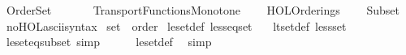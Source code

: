%
\begin{isabellebody}%
%
%
\isadelimdocument
%
\endisadelimdocument
%
\isatagdocument
%
\isamarkuptrue%
%
\endisatagdocument
{\isafolddocument}%
%
\isadelimdocument
%
\endisadelimdocument
%
\isadelimtheory
%
\endisadelimtheory
%
\isatagtheory
{}\isamarkupfalse%
\ Order{\isacharunderscore}{\kern0pt}Set\isanewline
\ \ \isanewline
\ \ \ \ Transport{\isachardot}{\kern0pt}Functions{\isacharunderscore}{\kern0pt}Monotone\isanewline
\ \ \ \ HOL{\isachardot}{\kern0pt}Orderings\isanewline
\ \ \ \ Subset\isanewline
{}%
\endisatagtheory
{\isafoldtheory}%
%
\isadelimtheory
\isanewline
%
\endisadelimtheory
\isanewline
{}\isamarkupfalse%
\ no{\isacharunderscore}{\kern0pt}HOL{\isacharunderscore}{\kern0pt}ascii{\isacharunderscore}{\kern0pt}syntax\isanewline
\isanewline
{}\isamarkupfalse%
\ set\ {\isacharcolon}{\kern0pt}{\isacharcolon}{\kern0pt}\ order\isanewline
{}\isanewline
\isanewline
{}\isamarkupfalse%
\ le{\isacharunderscore}{\kern0pt}set{\isacharunderscore}{\kern0pt}def{\isacharcolon}{\kern0pt}\ {\isachardoublequoteopen}less{\isacharunderscore}{\kern0pt}eq{\isacharunderscore}{\kern0pt}set\ {\isasymequiv}\ {\isacharparenleft}{\kern0pt}{\isasymsubseteq}{\isacharparenright}{\kern0pt}{\isachardoublequoteclose}\isanewline
{}\isamarkupfalse%
\ lt{\isacharunderscore}{\kern0pt}set{\isacharunderscore}{\kern0pt}def{\isacharcolon}{\kern0pt}\ {\isachardoublequoteopen}less{\isacharunderscore}{\kern0pt}set\ {\isasymequiv}\ {\isacharparenleft}{\kern0pt}{\isasymsubset}{\isacharparenright}{\kern0pt}{\isachardoublequoteclose}\isanewline
\isanewline
{}\isamarkupfalse%
\ le{\isacharunderscore}{\kern0pt}set{\isacharunderscore}{\kern0pt}eq{\isacharunderscore}{\kern0pt}subset\ {\isacharbrackleft}{\kern0pt}simp{\isacharbrackright}{\kern0pt}{\isacharcolon}{\kern0pt}\ {\isachardoublequoteopen}{\isacharparenleft}{\kern0pt}{\isasymle}{\isacharparenright}{\kern0pt}\ {\isacharequal}{\kern0pt}\ {\isacharparenleft}{\kern0pt}{\isasymsubseteq}{\isacharparenright}{\kern0pt}{\isachardoublequoteclose}%
\isadelimproof
\ %
\endisadelimproof
%
\isatagproof
{}\isamarkupfalse%
\ le{\isacharunderscore}{\kern0pt}set{\isacharunderscore}{\kern0pt}def\ \isamarkupfalse%
\ simp%
\endisatagproof
{\isafoldproof}%
%
\isadelimproof
%
\endisadelimproof
\isanewline
{}\isamarkupfalse%

\end{isabellebody}
